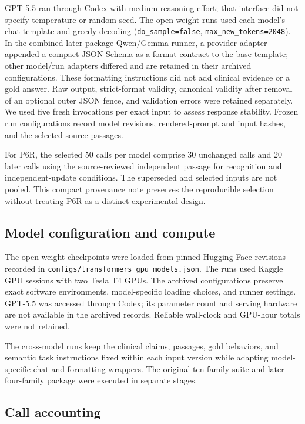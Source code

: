 \documentclass[11pt]{article}
\begin{document}
GPT-5.5 ran through Codex with medium reasoning effort; that interface did not specify temperature or random seed. The open-weight runs used each model's chat template and greedy decoding (\texttt{do\_sample=false}, \texttt{max\_new\_tokens=2048}). In the combined later-package Qwen/Gemma runner, a provider adapter appended a compact JSON Schema as a format contract to the base template; other model/run adapters differed and are retained in their archived configurations. These formatting instructions did not add clinical evidence or a gold answer. Raw output, strict-format validity, canonical validity after removal of an optional outer JSON fence, and validation errors were retained separately. We used five fresh invocations per exact input to assess response stability. Frozen run configurations record model revisions, rendered-prompt and input hashes, and the selected source passages.

For P6R, the selected 50 calls per model comprise 30 unchanged calls and 20 later calls using the source-reviewed independent passage for recognition and independent-update conditions. The superseded and selected inputs are not pooled. This compact provenance note preserves the reproducible selection without treating P6R as a distinct experimental design.

\subsection{Model configuration and compute}

The open-weight checkpoints were loaded from pinned Hugging Face revisions recorded in \texttt{configs/transformers\_gpu\_models.json}. The runs used Kaggle GPU sessions with two Tesla T4 GPUs. The archived configurations preserve exact software environments, model-specific loading choices, and runner settings. GPT-5.5 was accessed through Codex; its parameter count and serving hardware are not available in the archived records. Reliable wall-clock and GPU-hour totals were not retained.

The cross-model runs keep the clinical claims, passages, gold behaviors, and semantic task instructions fixed within each input version while adapting model-specific chat and formatting wrappers. The original ten-family suite and later four-family package were executed in separate stages.

\subsection{Call accounting}
\end{document}
